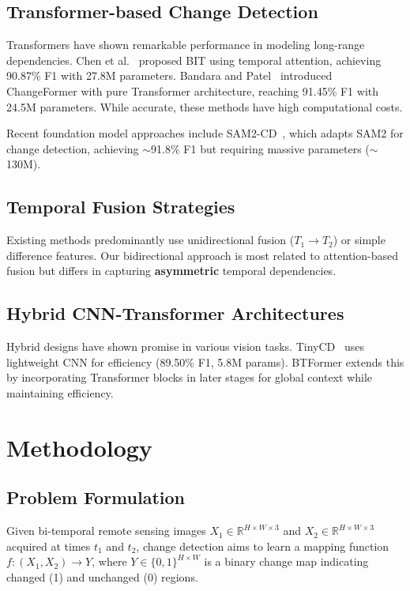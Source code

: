 \documentclass[journal]{IEEEtran}
\begin{document}
\subsection{Transformer-based Change Detection}

Transformers have shown remarkable performance in modeling long-range dependencies. Chen et al.~\cite{chen2021remote} proposed BIT using temporal attention, achieving 90.87\% F1 with 27.8M parameters. Bandara and Patel~\cite{bandara2022transformer} introduced ChangeFormer with pure Transformer architecture, reaching 91.45\% F1 with 24.5M parameters. While accurate, these methods have high computational costs.

Recent foundation model approaches include SAM2-CD~\cite{qin2025sam2}, which adapts SAM2 for change detection, achieving $\sim$91.8\% F1 but requiring massive parameters ($\sim$130M).

\subsection{Temporal Fusion Strategies}

Existing methods predominantly use unidirectional fusion ($T_1 \rightarrow T_2$) or simple difference features. Our bidirectional approach is most related to attention-based fusion but differs in capturing \textbf{asymmetric} temporal dependencies.

\subsection{Hybrid CNN-Transformer Architectures}

Hybrid designs have shown promise in various vision tasks. TinyCD~\cite{codegoni2023tinycd} uses lightweight CNN for efficiency (89.50\% F1, 5.8M params). BTFormer extends this by incorporating Transformer blocks in later stages for global context while maintaining efficiency.

\section{Methodology}

\subsection{Problem Formulation}

Given bi-temporal remote sensing images $X_1 \in \mathbb{R}^{H \times W \times 3}$ and $X_2 \in \mathbb{R}^{H \times W \times 3}$ acquired at times $t_1$ and $t_2$, change detection aims to learn a mapping function $f: (X_1, X_2) \rightarrow Y$, where $Y \in \{0,1\}^{H \times W}$ is a binary change map indicating changed (1) and unchanged (0) regions.
\end{document}
